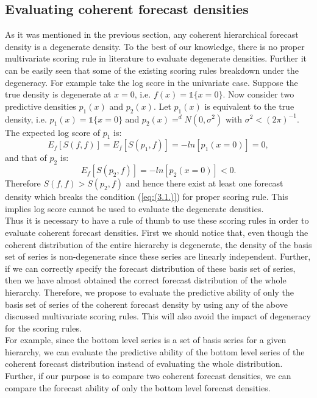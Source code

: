 \documentclass[a4paper, 11pt]{article}
\begin{document}
\subsection{Evaluating coherent forecast densities}

As it was mentioned in the previous section, any coherent hierarchical forecast density is a degenerate density. To the best of our knowledge, there is no proper multivariate scoring rule in literature to evaluate degenerate densities. Further it can be easily seen that some of the existing scoring rules breakdown under the degeneracy. For example take the log score in the univariate case. Suppose the true density is degenerate at $x=0$, i.e. $f(x)=\mathbb{1}\{x=0\}$.  Now consider two predictive densities $p_1(x)$ and $p_2(x)$. Let $p_1(x)$ is equivalent to the true density, i.e. $p_1(x)=\mathbb{1}\{x=0\}$ and $p_2(x) =^d N(0,\sigma^2)$ with $\sigma^2 < (2\pi)^{-1}$. The expected log score of $p_1$ is:
$$E_f[S(f,f)] = E_f[S(p_1,f)] = -ln[p_1(x=0)]=0,$$
\noindent
and that of $p_2$ is:
$$E_f[S(p_2,f)] = -ln[p_2(x=0)]<0.$$ 
\noindent
Therefore $S(f,f) > S(p_2,f)$ and hence there exist at least one forecast density which breaks the condition (\ref{eq:(3.1.)}) for proper scoring rule. This implies log score cannot be used to evaluate the degenerate densities.  \\

\noindent
Thus it is necessary to have a rule of thumb to use these scoring rules in order to evaluate coherent forecast densities. First we should notice that, even though the coherent distribution of the entire hierarchy is degenerate, the density of the basis set of series is non-degenerate since these series are linearly independent. Further, if we can correctly specify the forecast distribution of these basis set of series, then we have almost obtained the correct forecast distribution of the whole hierarchy. Therefore, we propose to evaluate the predictive ability of only the basis set of series of the coherent forecast density by using any of the above discussed multivariate scoring rules. This will also avoid the impact of degeneracy for the scoring rules. \\

\noindent
For example, since the bottom level series is a set of basis series for a given hierarchy, we can evaluate the predictive ability of the bottom level series of the coherent forecast distribution instead of evaluating the whole distribution. Further, if our purpose is to compare two coherent forecast densities, we can compare the forecast ability of only the bottom level forecast densities. 
\end{document}
